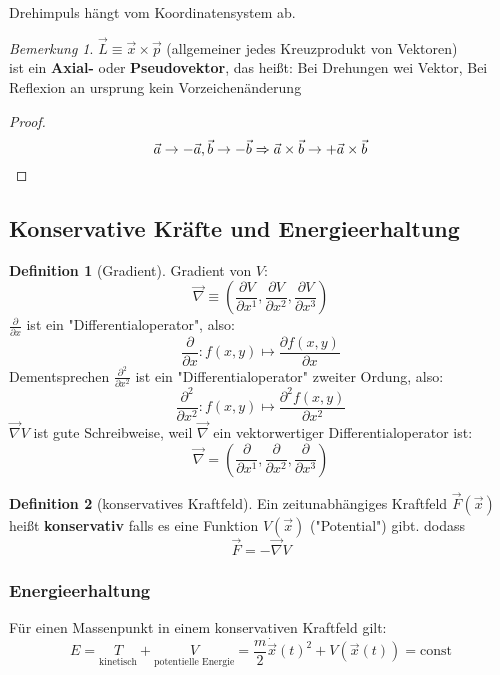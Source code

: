 \documentclass[a4paper]{scrartcl}
\renewcommand{\v}[1]{\vec{#1}}
\theoremstyle{definition}
\newtheorem{defn}{Definition}
\theoremstyle{plain}
\theoremstyle{remark}
\newtheorem{remark}{Bemerkung}
\begin{document}
Drehimpuls hängt vom Koordinatensystem ab.
\begin{remark}
$\v L \equiv \v x\times \v p$ (allgemeiner jedes Kreuzprodukt von Vektoren) \\
ist ein \textbf{Axial-} oder \textbf{Pseudovektor}, das heißt: Bei Drehungen wei Vektor, Bei Reflexion an ursprung kein Vorzeichenänderung
\begin{proof}
\[\v a \to -\v a, \v b \to -\v b \Rightarrow \v a \times \v b \to + \v a \times \v b \qedhere\]
\end{proof}
\end{remark}
\subsection{Konservative Kräfte und Energieerhaltung}
\label{sec-4-3}
\begin{defn}[Gradient]
Gradient von $V$:
\[\v\nabla \equiv \left(\frac{\partial V}{\partial x^1}, \frac{\partial V}{\partial x^2}, \frac{\partial V}{\partial x^3}\right)\]
$\frac{\partial}{\partial x}$ ist ein "Differentialoperator", also:
\[\frac{\partial}{\partial x}:f(x,y)\mapsto \frac{\partial f(x,y)}{\partial x}\]
Dementsprechen $\frac{\partial^2}{\partial x^2}$ ist ein "Differentialoperator" zweiter Ordung, also:
\[\frac{\partial^2}{\partial x^2}:f(x,y)\mapsto \frac{\partial^2 f(x,y)}{\partial x^2}\]
$\v\nabla V$ ist gute Schreibweise, weil $\v\nabla$ ein vektorwertiger Differentialoperator ist:
\[\v\nabla = \left(\frac{\partial}{\partial x^1}, \frac{\partial}{\partial x^2}, \frac{\partial}{\partial x^3}\right)\]
\end{defn}
\begin{defn}[konservatives Kraftfeld]
Ein zeitunabhängiges Kraftfeld $\v F(\v x)$ heißt \textbf{konservativ} falls es eine Funktion $V(\v x)$ ("Potential") gibt. dodass
\[\v F = -\v \nabla V\]
\end{defn}
\subsubsection{Energieerhaltung}
\label{sec-4-3-1}
Für einen Massenpunkt in einem konservativen Kraftfeld gilt:
\[E = \underset{\text{kinetisch}}{T} + \underset{\text{potentielle Energie}}{V} = \frac{m}{2}\dot{\v x}(t)^2 + V(\v x(t)) = \text{const}\]
\end{document}
